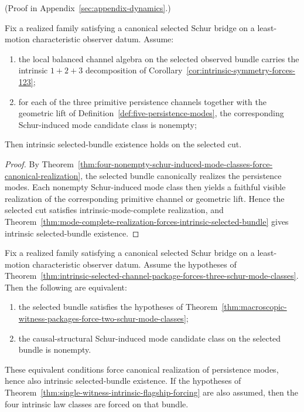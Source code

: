 (Proof in Appendix~\ref{sec:appendix-dynamics}.)

\begin{corollary}
\label{cor:five-nonempty-schur-induced-mode-classes-force-intrinsic-selected-bundle-existence}
Fix a realized family satisfying a canonical selected Schur bridge on a
least-motion characteristic observer datum. Assume:
\begin{enumerate}[label=(\roman*), leftmargin=2em, itemsep=0.2em]
\item the local balanced channel algebra on the selected observed bundle
      carries the intrinsic \(1+2+3\) decomposition of
      Corollary~\ref{cor:intrinsic-symmetry-forces-123};
\item for each of the three primitive persistence channels together with the
      geometric lift of Definition~\ref{def:five-persistence-modes}, the
      corresponding Schur-induced mode candidate class is nonempty;
\end{enumerate}
Then intrinsic selected-bundle existence holds on the selected cut.
\end{corollary}

\begin{proof}
By
Theorem~\ref{thm:four-nonempty-schur-induced-mode-classes-force-canonical-realization},
the selected bundle canonically realizes the persistence modes. Each nonempty
Schur-induced mode class then yields a faithful visible realization of the
corresponding primitive channel or geometric lift. Hence the selected cut
satisfies intrinsic-mode-complete realization, and
Theorem~\ref{thm:mode-complete-realization-forces-intrinsic-selected-bundle}
gives intrinsic selected-bundle existence.
\end{proof}

\begin{theorem}
\label{thm:geometric-witness-is-exact-remaining-intrinsic-obstruction}
Fix a realized family satisfying a canonical selected Schur bridge on a
least-motion characteristic observer datum. Assume the hypotheses of
Theorem~\ref{thm:intrinsic-selected-channel-package-forces-three-schur-mode-classes}.
Then the following are equivalent:
\begin{enumerate}[label=(\roman*), leftmargin=2em, itemsep=0.2em]
\item the selected bundle satisfies the hypotheses of
      Theorem~\ref{thm:macroscopic-witness-packages-force-two-schur-mode-classes};
\item the causal-structural Schur-induced mode candidate class on the selected
      bundle is nonempty.
\end{enumerate}
These equivalent conditions force canonical realization of persistence modes,
hence also intrinsic selected-bundle existence.
If the hypotheses of
Theorem~\ref{thm:single-witness-intrinsic-flagship-forcing} are also assumed,
then the four intrinsic law classes are forced on that bundle.
\end{theorem}

